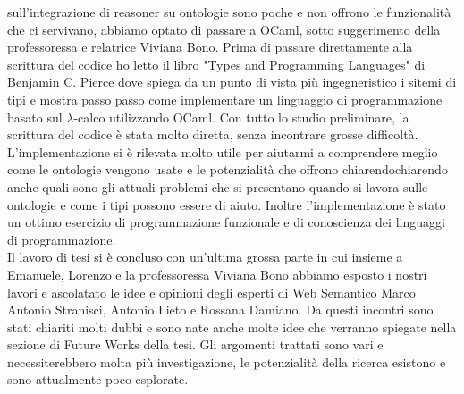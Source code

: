     sull'integrazione di reasoner su ontologie sono poche e non offrono le funzionalità che ci servivano, abbiamo optato di passare a OCaml, sotto suggerimento della professoressa e relatrice Viviana Bono. 
    Prima di passare direttamente alla scrittura del codice ho letto il libro "Types and Programming Languages" \cite{TypesAndProgrammingLanguages} di Benjamin C. Pierce dove spiega da un punto di vista
    più ingegneristico i sitemi di tipi e mostra passo passo come implementare un linguaggio di programmazione basato sul $\lambda$-calco utilizzando OCaml.
    Con tutto lo studio preliminare, la scrittura del codice è stata molto diretta, senza incontrare grosse difficoltà.
    \\L'implementazione si è rilevata molto utile per aiutarmi a comprendere meglio come le ontologie vengono usate e le potenzialità che offrono chiarendochiarendo anche
    quali sono gli attuali problemi che si presentano quando si lavora sulle ontologie e come i tipi possono essere di aiuto. Inoltre l'implementazione è stato un ottimo
    esercizio di programmazione funzionale e di conoscienza dei linguaggi di programmazione.
    \\Il lavoro di tesi si è concluso con un'ultima grossa parte in cui insieme a Emanuele, Lorenzo e la professoressa Viviana Bono abbiamo esposto i nostri lavori e ascolatato le idee e opinioni degli esperti
    di Web Semantico Marco Antonio Stranisci, Antonio Lieto e Rossana Damiano. Da questi incontri sono stati chiariti molti dubbi e sono nate anche molte idee che verranno
    spiegate nella sezione di Future Works %
    della tesi. Gli argomenti trattati sono vari e necessiterebbero molta più investigazione, le potenzialità della ricerca esistono
    e sono attualmente poco esplorate. 